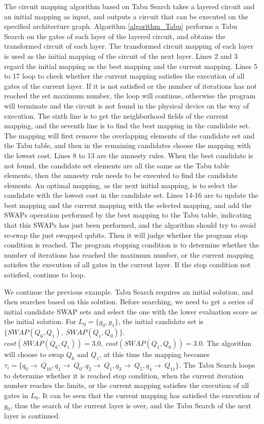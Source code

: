\documentclass[runningheads]{llncs}
\begin{document}
The circuit mapping algorithm based on Tabu Search takes a layered circuit and an initial mapping as input, 
and outputs a circuit that can be executed on the specified architecture graph.
Algorithm \ref{algorithm_Tabu} performs a Tabu Search on the gates of each layer of the layered circuit, 
and obtains the transformed circuit of each layer. 
The transformed circuit mapping of each layer is used as the initial mapping of the circuit of the next layer.
Lines 2 and 3 regard the initial mapping as the best mapping and the current mapping.
Lines 5 to 17 loop to check whether the current mapping satisfies the execution of all gates of the current layer. 
If it is not satisfied or the number of iterations has not reached the set maximum number, 
the loop will continue, otherwise the program will terminate and the circuit is not found in the physical device 
on the way of execution.
The sixth line is to get the neighborhood fields of the current mapping, 
and the seventh line is to find the best mapping in the candidate set. 
The mapping will first remove the overlapping elements of the candidate set and the Tabu table, 
and then in the remaining candidates choose the mapping  with the lowest cost.
Lines 8 to 13 are the amnesty rules. When the best candidate is not found, 
the candidate set elements are all the same as the Tabu table elements, 
then the amnesty rule needs to be executed to find the candidate elements.
An optimal mapping, as the next initial mapping, is to select the candidate 
with the lowest cost in the candidate set.
Lines 14-16 are to update the best mapping and the current mapping with the selected mapping, 
and add the SWAPs operation performed by the best mapping to the Tabu table, 
indicating that this SWAPs has just been performed, 
and the algorithm should try to avoid re-swap the just swapped qubits. 
Then it will judge whether the program stop condition is reached. 
The program stopping condition is to determine whether the number of iterations 
has reached the maximum number, or the current mapping satisfies the execution of 
all gates in the current layer. If the stop condition not satisfied, continue to loop.
\begin{example}
We continue the previous example. Tabu Search requires an initial solution, 
and then searches based on this solution. 
Before searching, we need to get a series of initial candidate SWAP sets
and select the one with the lower evaluation score as the initial solution.
For $L_{0}=\{g_{0},g_{1}\}$, the initial candidate set is $\{SWAP(Q_{6},Q_{1}),\ SWAP(Q_{1},Q_{0}) \}$.
$cost(SWAP(Q_{6},Q_{1}))=3.0,\ cost(SWAP(Q_{1},Q_{0}))=3.0$.
The algorithm will choose to swap $Q_{6}$ and $Q_{1}$, 
at this time the mapping becomes $\tau_{i}=\{q_{0}\rightarrow \ Q_{10},q_{1}\rightarrow \ Q_{0},
q_{2}\rightarrow \ Q_{1},q_{3}\rightarrow \ Q_{5},q_{4}\rightarrow \ Q_{11}\}$. 
The Tabu Search loops to determine whether it is reached stop condition,
when the current iteration number reaches the limits, 
or the current mapping satisfies the execution of all gates in $L_{0}$.
It can be seen that the current mapping has satisfied the execution of $g_{0}$, 
thus the search of the current layer is over, and the Tabu Search of the next layer is continued.
\end{example}
\end{document}
